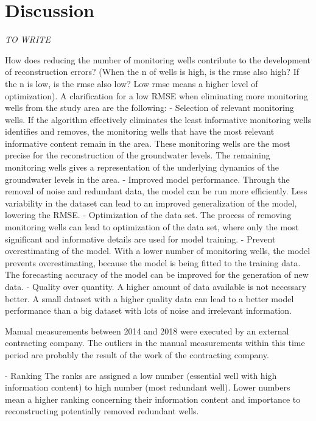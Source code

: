 \chapter{Discussion}
\label{chapter:discussion}

\emph{TO WRITE}


How does reducing the number of monitoring wells contribute to the development of reconstruction errors? (When the n of wells is high, is the rmse also high? If the n is low, is the rmse also low? Low rmse means a higher level of optimization). 
A clarification for a low RMSE when eliminating more monitoring wells from the study area are the following: 
- Selection of relevant monitoring wells. If the algorithm effectively eliminates the least informative monitoring wells identifies and removes, the monitoring wells that have the most relevant informative content remain in the area. These monitoring wells are the most precise for the reconstruction of the groundwater levels. The remaining monitoring wells gives a representation of the underlying dynamics of the groundwater levels in the area.
- Improved model performance. Through the removal of noise and redundant data, the model can be run more efficiently. Less variability in the dataset can lead to an improved generalization of the model, lowering the RMSE.
- Optimization of the data set. The process of removing monitoring wells can lead to optimization of the data set, where only the most significant and informative details are used for model training. 
- Prevent overestimating of the model. With a lower number of monitoring wells, the model prevents overestimating, because the model is being fitted to the training data. The forecasting accuracy of the model can be improved for the generation of new data. 
- Quality over quantity.  A higher amount of data available is not necessary better. A small dataset with a higher quality data can lead to a better model performance than a big dataset with lots of noise and irrelevant information. 









Manual measurements between 2014 and 2018 were executed by an external contracting company. The outliers in the manual measurements within this time period are probably the result of the work of  the contracting company. 

- Ranking 
The ranks are assigned a low number (essential well with high information content) to high number (most redundant well). Lower numbers mean a higher ranking concerning their information content and importance to reconstructing potentially removed redundant wells. 

